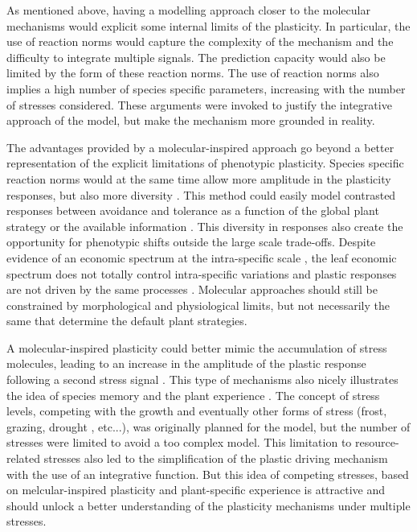 As mentioned above, having a modelling approach closer to the molecular mechanisms would explicit some internal limits of the plasticity. In particular, the use of reaction norms would capture the complexity of the mechanism and the difficulty to integrate multiple signals. The prediction capacity would also be limited by the form of these reaction norms. The use of reaction norms also implies a high number of species specific parameters, increasing with the number of stresses considered. These arguments were invoked to justify the integrative approach of the model, but make the mechanism more grounded in reality.

The advantages provided by a molecular-inspired approach go beyond a better representation of the explicit limitations of phenotypic plasticity. Species specific reaction norms would at the same time allow more amplitude in the plasticity responses, but also more diversity \parencite{kichenin_contrasting_2013, wellstein_intraspecific_2013}. This method could easily model contrasted responses between avoidance and tolerance as a function of the global plant strategy \parencite{perez-ramos_tradeoffs_2013} or the available information \parencite{heger_light_2016}. This diversity in responses also create the opportunity for phenotypic shifts outside the large scale trade-offs. Despite evidence of an economic spectrum at the intra-specific scale \parencite{hu_novel_2015, fajardo_intraspecific_2018}, the leaf economic spectrum does not totally control intra-specific variations \parencite{fajardo_intraspecific_2018} and plastic responses are not driven by the same processes \parencite{ryser_consequences_2000}. Molecular approaches should still be constrained by morphological and physiological limits, but not necessarily the same that determine the default plant strategies.

A molecular-inspired plasticity could better mimic the accumulation of stress molecules, leading to an increase in the amplitude of the plastic response following a second stress signal \parencite{crisp_reconsidering_2016}. This type of mechanisms also nicely illustrates the idea of species memory and the plant experience . The concept of stress levels, competing with the growth \parencite{herms_dilemma_1992} and eventually other forms of stress (frost, grazing, drought , etc...), was originally planned for the model, but the number of stresses were limited to avoid a too complex model. This limitation to resource-related stresses also led to the simplification of the plastic driving mechanism with the use of an integrative function. But this idea of competing stresses, based on melcular-inspired plasticity and plant-specific experience is attractive and should unlock a better understanding of the plasticity mechanisms under multiple stresses.

